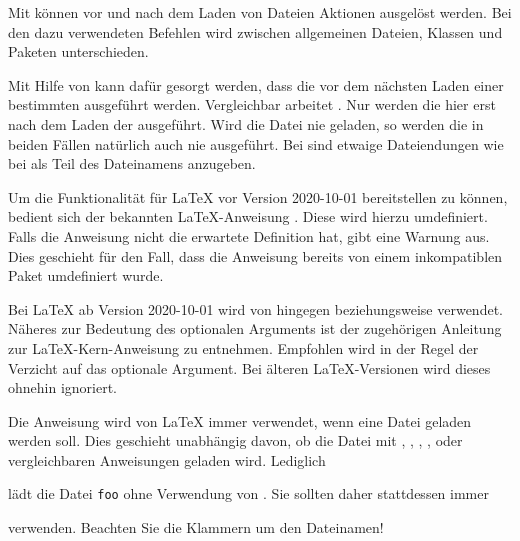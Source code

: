 Mit  können vor und nach dem Laden von Dateien Aktionen
ausgelöst werden. Bei den dazu verwendeten Befehlen wird zwischen allgemeinen
Dateien, Klassen und Paketen unterschieden.


\begin{Declaration}
\end{Declaration}%
Mit Hilfe von  kann dafür gesorgt werden, dass die
 vor dem nächsten Laden einer bestimmten 
ausgeführt werden. Vergleichbar arbeitet . Nur werden die
 hier erst nach dem Laden der 
ausgeführt. Wird die Datei nie geladen, so werden die  in
beiden Fällen natürlich auch nie ausgeführt. Bei  sind etwaige
Dateiendungen wie bei  als Teil des Dateinamens anzugeben.

Um die Funktionalität für \LaTeX{} vor Version 2020-10-01 bereitstellen zu
können, bedient sich  der bekannten
\LaTeX-Anweisung . Diese wird
hierzu umdefiniert.  Falls die Anweisung nicht die erwartete Definition hat,
gibt  eine Warnung aus.  Dies geschieht für
den Fall, dass die Anweisung bereits von einem inkompatiblen Paket umdefiniert
wurde.

Bei \LaTeX{} ab
Version 2020-10-01 wird von  hingegen
beziehungsweise
verwendet. Näheres zur Bedeutung des optionalen Arguments  ist
der zugehörigen Anleitung zur \LaTeX-Kern-Anweisung  zu
entnehmen. Empfohlen wird in der Regel der Verzicht auf das optionale
Argument. Bei älteren \LaTeX-Versionen wird dieses ohnehin ignoriert.
  
Die Anweisung  wird von \LaTeX{} immer verwendet,
wenn eine Datei geladen werden soll. Dies geschieht unabhängig davon, ob die
Datei mit , , ,
,  oder vergleichbaren Anweisungen
geladen wird. Lediglich
\begin{lstcode}
  
\end{lstcode}
lädt die Datei \texttt{foo} ohne Verwendung von . Sie
sollten daher stattdessen immer
\begin{lstcode}
  
\end{lstcode}
verwenden. Beachten Sie die Klammern um den Dateinamen!%
%
\EndIndexGroup



